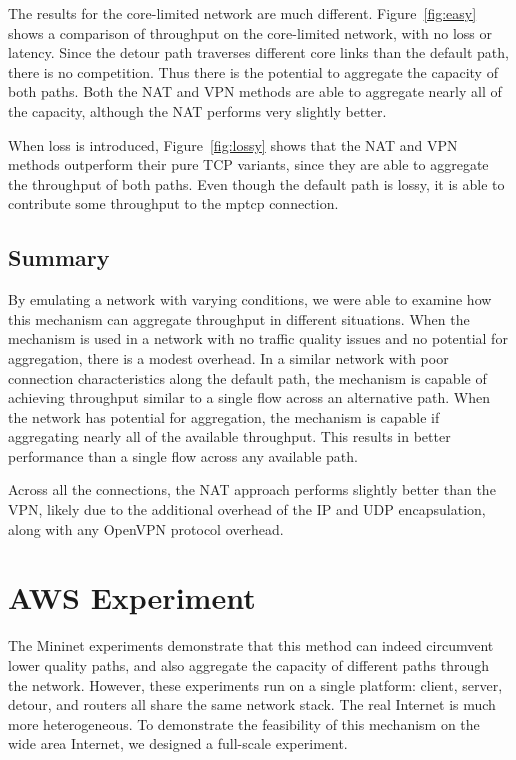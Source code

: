 \documentclass{cwru}
\begin{document}
The results for the core-limited network are much different.
Figure~\ref{fig:easy} shows a comparison of throughput on the core-limited
network, with no loss or latency. Since the detour path traverses different core
links than the default path, there is no competition. Thus there is the
potential to aggregate the capacity of both paths. Both the NAT and VPN methods
are able to aggregate nearly all of the capacity, although the NAT performs very
slightly better.

When loss is introduced, Figure~\ref{fig:lossy} shows that the NAT and VPN
methods outperform their pure TCP variants, since they are able to aggregate the
throughput of both paths. Even though the default path is lossy, it is able to
contribute some throughput to the \ac{mptcp} connection.

\subsection{Summary}

By emulating a network with varying conditions, we were able to examine how this
mechanism can aggregate throughput in different situations. When the mechanism
is used in a network with no traffic quality issues and no potential for
aggregation, there is a modest overhead. In a similar network with poor
connection characteristics along the default path, the mechanism is capable of
achieving throughput similar to a single flow across an alternative path.
When the network has potential for aggregation, the mechanism is capable if
aggregating nearly all of the available throughput. This results in better
performance than a single flow across any available path.

Across all the connections, the NAT approach performs slightly better than the
VPN, likely due to the additional overhead of the IP and UDP encapsulation,
along with any OpenVPN protocol overhead.

\section{AWS Experiment}

The Mininet experiments demonstrate that this method can indeed circumvent lower
quality paths, and also aggregate the capacity of different paths through the
network. However, these experiments run on a single platform: client, server,
detour, and routers all share the same network stack. The real Internet is much
more heterogeneous. To demonstrate the feasibility of this mechanism on the wide
area Internet, we designed a full-scale experiment.
\end{document}
